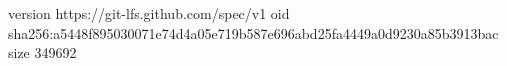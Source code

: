 version https://git-lfs.github.com/spec/v1
oid sha256:a5448f895030071e74d4a05e719b587e696abd25fa4449a0d9230a85b3913bac
size 349692
